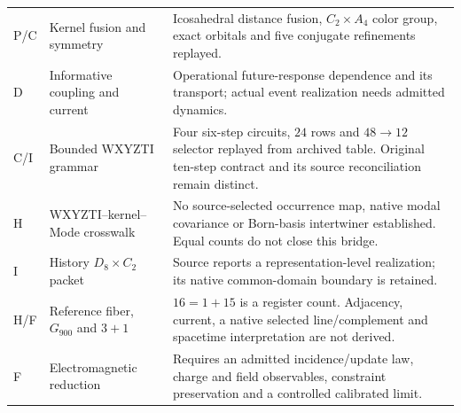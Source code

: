 \begin{longtable}{@{}p{}p{}p{}@{}}
P/C & Kernel fusion and symmetry & Icosahedral distance fusion, $C_2\times A_4$ color group, exact orbitals and five conjugate refinements replayed. \\
D & Informative coupling and current & Operational future-response dependence and its transport; actual event realization needs admitted dynamics. \\
C/I & Bounded WXYZTI grammar & Four six-step circuits, $24$ rows and $48\to12$ selector replayed from archived table. Original ten-step contract and its source reconciliation remain distinct. \\
H & WXYZTI--kernel--Mode crosswalk & No source-selected occurrence map, native modal covariance or Born-basis intertwiner established. Equal counts do not close this bridge. \\
I & History $D_8\times C_2$ packet & Source reports a representation-level realization; its native common-domain boundary is retained. \\
H/F & Reference fiber, $G_{900}$ and $3+1$ & $16=1+15$ is a register count. Adjacency, current, a native selected line/complement and spacetime interpretation are not derived. \\
F & Electromagnetic reduction & Requires an admitted incidence/update law, charge and field observables, constraint preservation and a controlled calibrated limit. \\


\end{longtable}
